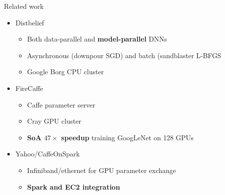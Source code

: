 \documentclass[pdf]{beamer}
\begin{document}
\begin{frame}[t]{Related work}
    \begin{itemize}
        \item Distbelief \cite{dean2012large} 
            \begin{itemize}
                \item Both data-parallel and \textbf{model-parallel} DNNs
                \item Asynchronous (downpour SGD) and batch (sandblaster L-BFGS
                \item Google Borg CPU cluster
            \end{itemize}
        \item FireCaffe \cite{iandola2015firecaffe}
            \begin{itemize}
                \item Caffe parameter server
                \item Cray GPU cluster
                \item \textbf{SoA $47\times$ speedup} training GoogLeNet
                    on 128 GPUs
            \end{itemize}
        \item Yahoo/CaffeOnSpark \cite{caffe-on-spark}
            \begin{itemize}
                \item Infiniband/ethernet for GPU parameter exchange
                \item \textbf{Spark and EC2 integration}
            \end{itemize}
    \end{itemize}
\end{frame}
\end{document}
